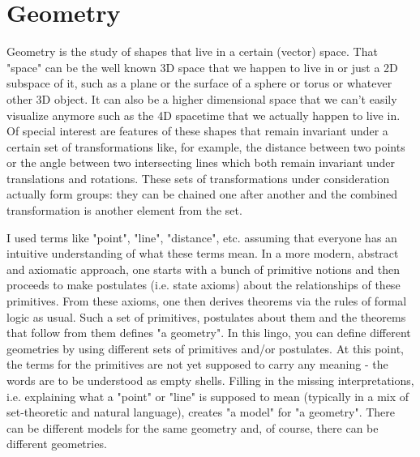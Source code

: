 \chapter{Geometry}
Geometry is the study of shapes that live in a certain (vector) space. That "space" can be the well known 3D space that we happen to live in or just a 2D subspace of it, such as a plane or the surface of a sphere or torus or whatever other 3D object. It can also be a higher dimensional space that we can't easily visualize anymore such as the 4D spacetime that we actually happen to live in. Of special interest are features of these shapes that remain invariant under a certain set of transformations like, for example, the distance between two points or the angle between two intersecting lines which both remain invariant under translations and rotations. These sets of transformations under consideration actually form groups: they can be chained one after another and the combined transformation is another element from the set. 

\medskip
I used terms like "point", "line", "distance", etc. assuming that everyone has an intuitive understanding of what these terms mean. In a more modern, abstract and axiomatic approach, one starts with a bunch of primitive notions and then proceeds to make postulates (i.e. state axioms) about the relationships of these primitives. From these axioms, one then derives theorems via the rules of formal logic as usual. Such a set of primitives, postulates about them and the theorems that follow from them defines "a geometry". In this lingo, you can define different geometries by using different sets of primitives and/or postulates. At this point, the terms for the primitives are not yet supposed to carry any meaning - the words are to be understood as empty shells. Filling in the missing interpretations, i.e. explaining what a "point" or "line" is supposed to mean (typically in a mix of set-theoretic and natural language), creates "a model" for "a geometry". There can be different models for the same geometry and, of course, there can be different geometries.

